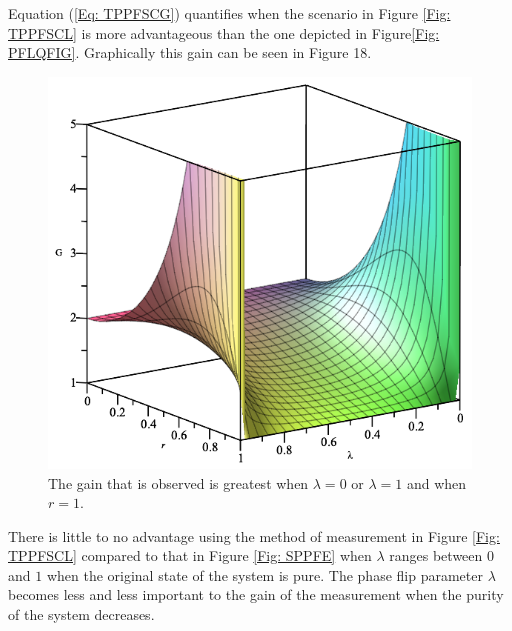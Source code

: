 \documentclass[twocolumn]{article}
\begin{document}
Equation (\ref{Eq: TPPFSCG}) quantifies when the scenario in Figure \ref{Fig: TPPFSCL} is more advantageous than the one depicted in Figure\ref{Fig: PFLQFIG}. Graphically this gain can be seen in Figure 18.
\begin{figure}[ht]
    \centering
    \includegraphics[scale=0.35]{Phase-Flip-One-Channel-Lambda-and-r-Gain.png}
    \caption{\footnotesize{The gain that is observed is greatest when $\lambda=0$ or $\lambda=1$ and when $r=1$.}}
    \label{Fig: PFOCLRG}
\end{figure}
\par \noindent
There is little to no advantage using the method of measurement in Figure \ref{Fig: TPPFSCL} compared to that in Figure \ref{Fig: SPPFE} when $\lambda$ ranges between $0$ and $1$ when the original state of the system is pure. The phase flip parameter $\lambda$ becomes less and less important to the gain of the measurement when the purity of the system decreases.
\end{document}
